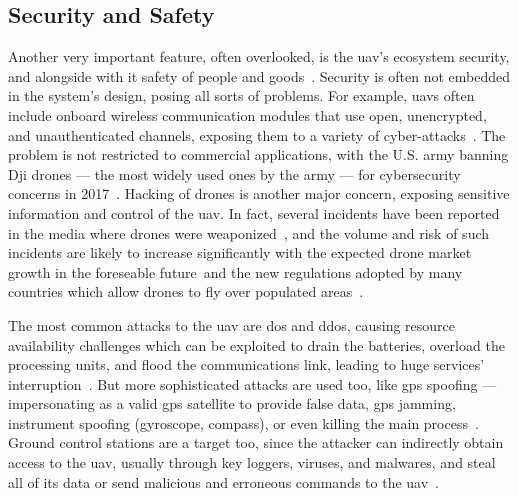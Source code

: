 \subsection{Security and Safety}%
\label{sec:security-safety}
Another very important feature, often overlooked, is the \gls{uav}'s ecosystem
security, and alongside with it safety of people and goods~\cite{leccadito2018survey}. Security is often
not embedded in the system's design, posing all sorts of problems. For example,
\glspl{uav} often include onboard wireless communication modules that use open,
unencrypted, and unauthenticated channels, exposing them to a variety of
cyber-attacks~\cite{kishnaCyberVulnerUAVReview2017,mansfieldUAVCyberThreats2013}.
The problem is not restricted to
commercial applications, with the U.S. army banning Dji drones --- the most
widely used ones by the army --- for cybersecurity
concerns in 2017~\cite{suasNewsDjiDronesBanned2017}. Hacking of drones is
another major concern, exposing sensitive information and control of the
\gls{uav}. In fact, several incidents have been reported in the media where
drones were weaponized~\cite{spiegelUAVAccident2015,nytimesUAVAccident2018,theDriveUAVAccident2019}, and the volume and risk of such incidents are
likely to increase significantly with the expected drone market growth in the
foreseable future~\cite{mohsan2022towards}and the new regulations adopted by many countries which allow
drones to fly over populated areas~\cite{stocker2017UAVRegulationsReview}.

The most common attacks to the  \gls{uav} are \gls{dos} and \gls{ddos}, causing
resource availability challenges which can be exploited to drain the batteries,
overload the processing units, and flood the communications link, leading to
huge services' interruption~\cite{mohsan2022towards}. But more sophisticated attacks are used too, like
\gls{gps} spoofing --- impersonating as a valid \gls{gps} satellite to provide
false data, \gls{gps} jamming, instrument spoofing (gyroscope, compass), or even
killing the main process~\cite{nassi2021sok}. Ground control stations are a target too, since the
attacker can indirectly obtain access to the \gls{uav}, usually through key
loggers, viruses, and malwares,  and steal all of its data or send malicious
and erroneous commands to the \gls{uav}~\cite{mohsan2022towards}.

